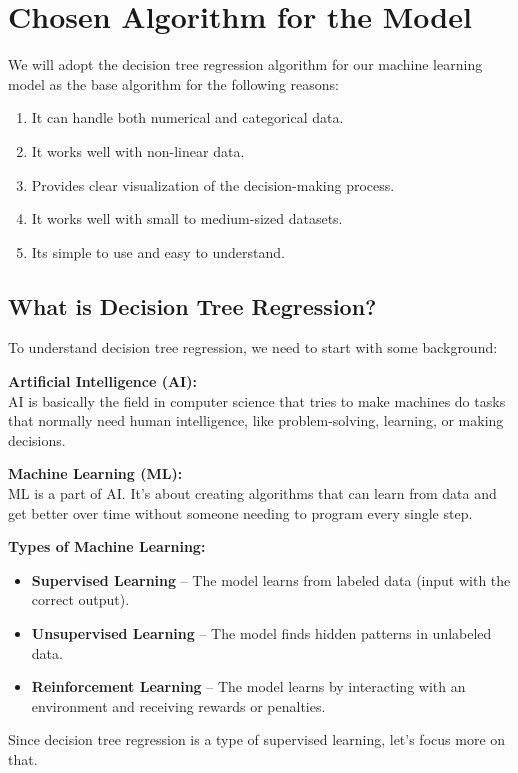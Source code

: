 \documentclass[12pt,oneside]{report}
\begin{document}
\section{Chosen Algorithm for the Model}
We will adopt the decision tree regression algorithm for our machine learning model as the base algorithm for the following reasons:

\begin{enumerate}
    \item It can handle both numerical and categorical data.
    \item It works well with non-linear data.
    \item Provides clear visualization of the decision-making process.
    \item It works well with small to medium-sized datasets.
    \item Its simple to use and easy to understand.
\end{enumerate}


\subsection{What is Decision Tree Regression?}
To understand decision tree regression, we need to start with some background:

\textbf{Artificial Intelligence (AI):} \\
AI is basically the field in computer science that tries to make machines do tasks that normally need human intelligence, like problem-solving, learning, or making decisions.

\textbf{Machine Learning (ML):} \\
ML is a part of AI. It’s about creating algorithms that can learn from data and get better over time without someone needing to program every single step.

\textbf{Types of Machine Learning:}
\begin{itemize}
    \item \textbf{Supervised Learning} – The model learns from labeled data (input with the correct output).
    \item \textbf{Unsupervised Learning} – The model finds hidden patterns in unlabeled data.
    \item \textbf{Reinforcement Learning} – The model learns by interacting with an environment and receiving rewards or penalties.
\end{itemize}

Since decision tree regression is a type of supervised learning, let’s focus more on that.
\end{document}
